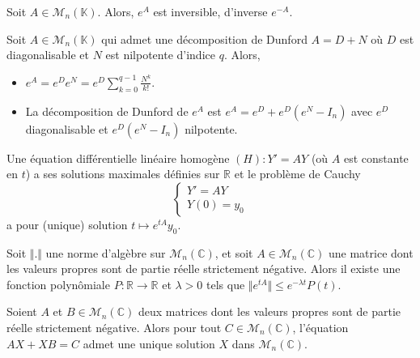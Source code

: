 	\begin{corollary}
		Soit $A \in \mathcal{M}_n(\mathbb{K})$. Alors, $e^A$ est inversible, d'inverse $e^{-A}$.
	\end{corollary}
	
	\begin{example}
		Soit $A \in \mathcal{M}_n(\mathbb{K})$ qui admet une décomposition de Dunford $A = D+N$ où $D$ est diagonalisable et $N$ est nilpotente d'indice $q$. Alors,
		\begin{itemize}
			\item $e^A = e^D e^N = e^D \sum_{k=0}^{q-1} \frac{N^k}{k!}$.
			\item La décomposition de Dunford de $e^A$ est $e^A = e^D + e^D(e^N - I_n)$ avec $e^D$ diagonalisable et $e^D(e^N - I_n)$ nilpotente.
		\end{itemize}
	\end{example}
	
	
	\begin{application}
		Une équation différentielle linéaire homogène $(H) : Y' = AY$ (où $A$ est constante en $t$) a ses solutions maximales définies sur $\mathbb{R}$ et le problème de Cauchy
		\[ \begin{cases} Y' = AY \\ Y(0) = y_0 \end{cases} \]
		a pour (unique) solution $t \mapsto e^{tA} y_0$.
	\end{application}
	
	
	\begin{lemma}
		Soit $\Vert . \Vert$ une norme d'algèbre sur $\mathcal{M}_n(\mathbb{C})$, et soit $A \in \mathcal{M}_n(\mathbb{C})$ une matrice dont les valeurs propres sont de partie réelle strictement négative. Alors il existe une fonction polynômiale $P : \mathbb{R} \rightarrow \mathbb{R}$ et $\lambda > 0$ tels que $\Vert e^{tA} \Vert \leq e^{- \lambda t} P(t)$.
	\end{lemma}
	
	\begin{application}
		Soient $A$ et $B \in \mathcal{M}_n(\mathbb{C})$ deux matrices dont les valeurs propres sont de partie réelle strictement négative. Alors pour tout $C \in \mathcal{M}_n(\mathbb{C})$, l'équation $AX + XB = C$ admet une unique solution $X$ dans $\mathcal{M}_n(\mathbb{C})$.
	\end{application}
	
